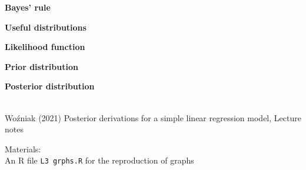 \documentclass[notes,blackandwhite,mathsans]{beamer}
\begin{document}
{
\begin{frame}

\vspace{0.5cm} \textbf{\color{mcxs3}Bayes' rule}

\bigskip\textbf{\color{mcxs2}Useful distributions}

\bigskip\textbf{\color{mcxs2}Likelihood function}

\bigskip\textbf{\color{mcxs2}Prior distribution}

\bigskip\textbf{\color{mcxs2}Posterior distribution}



 \\ \footnotesize
{\color{mcxs2}Wo\'zniak (2021) Posterior derivations for a simple linear regression model, Lecture notes}\\

\bigskip\normalsize{\color{mcxs5}Materials:}\\ \footnotesize
{\color{mcxs2}An R file} \texttt{\color{mcxs5}L3 grphs.R} {\color{mcxs2}for the reproduction of graphs}\\

\end{frame}
}



%
%
%
\end{document}
